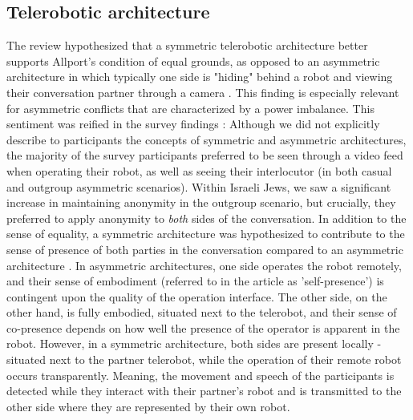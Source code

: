 \documentclass[dissertation,math,vertlayout,pdfa,colorlinks]{aaltoseries}
\begin{document}
\subsection{Telerobotic architecture}
The review hypothesized that a symmetric telerobotic architecture better supports Allport's condition of equal grounds, as opposed to an asymmetric architecture in which typically one side is "hiding" behind a robot and viewing their conversation partner through a camera \cite[p. 78]{peledTelerobotContactHypothesis2022}. This finding is especially relevant for asymmetric conflicts that are characterized by a power imbalance. This sentiment was reified in the survey findings \cite[p. 11]{peledTeleroboticIntergroupContact2024}: Although we did not explicitly describe to participants the concepts of symmetric and asymmetric architectures, the majority of the survey participants preferred to be seen through a video feed when operating their robot, as well as seeing their interlocutor (in both casual and outgroup asymmetric scenarios). Within Israeli Jews, we saw a significant increase in maintaining anonymity in the outgroup scenario, but crucially, they preferred to apply anonymity to \textit{both} sides of the conversation. In addition to the sense of equality, a symmetric architecture was hypothesized to contribute to the sense of presence of both parties in the conversation compared to an asymmetric architecture \cite[p. 78]{peledTeleroboticIntergroupContact2024}. In asymmetric architectures, one side operates the robot remotely, and their sense of embodiment (referred to in the article as 'self-presence') is contingent upon the quality of the operation interface. The other side, on the other hand, is fully embodied, situated next to the telerobot, and their sense of co-presence depends on how well the presence of the operator is apparent in the robot. However, in a symmetric architecture, both sides are present locally - situated next to the partner telerobot, while the operation of their remote robot occurs transparently. Meaning, the movement and speech of the participants is detected while they interact with their partner's robot and is transmitted to the other side where they are represented by their own robot.
\end{document}
